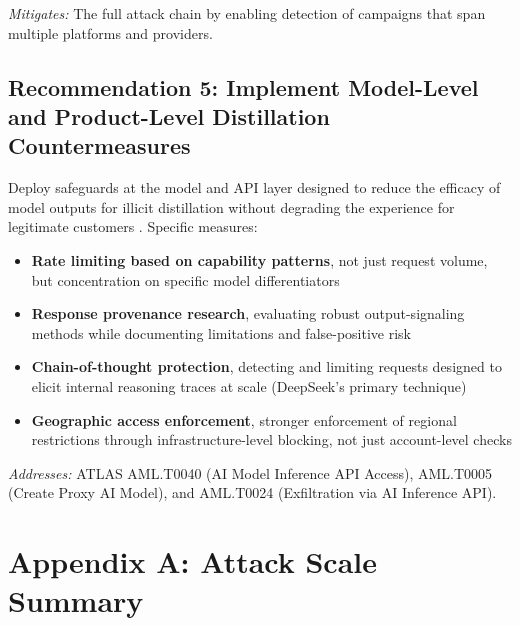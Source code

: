 \documentclass[11pt,a4paper]{article}
\begin{document}
\noindent\textit{Mitigates:} The full attack chain by enabling detection of campaigns that span multiple platforms and providers.

\subsection{Recommendation 5: Implement Model-Level and Product-Level Distillation Countermeasures}

Deploy safeguards at the model and API layer designed to reduce the efficacy of model outputs for illicit distillation without degrading the experience for legitimate customers \cite{anthropic_blog}. Specific measures:

\begin{itemize}[leftmargin=20pt, noitemsep]
    \item \textbf{Rate limiting based on capability patterns}, not just request volume, but concentration on specific model differentiators
    \item \textbf{Response provenance research}, evaluating robust output-signaling methods while documenting limitations and false-positive risk
    \item \textbf{Chain-of-thought protection}, detecting and limiting requests designed to elicit internal reasoning traces at scale (DeepSeek's primary technique)
    \item \textbf{Geographic access enforcement}, stronger enforcement of regional restrictions through infrastructure-level blocking, not just account-level checks
\end{itemize}

\noindent\textit{Addresses:} ATLAS AML.T0040 (AI Model Inference API Access), AML.T0005 (Create Proxy AI Model), and AML.T0024 (Exfiltration via AI Inference API).

\newpage

\section*{Appendix A: Attack Scale Summary}
\end{document}
